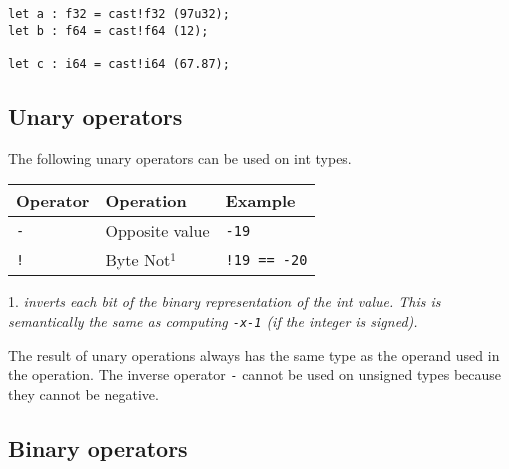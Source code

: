\begin{itemize}
  \begin{lstlisting}[style=coloredverbatim]
let a : f32 = cast!f32 (97u32);
let b : f64 = cast!f64 (12);

let c : i64 = cast!i64 (67.87);
  \end{lstlisting}

\end{itemize}

\subsection{Unary operators}
\label{sec:orge691bb5}

The following unary operators can be used on int types.
\smallskip


\begin{center}
  \vspace{-5pt}
  \begin{threeparttable}
    \begin{tabular}{|l|ll|}
      \hline
      Operator & Operation & Example\\[0pt]
      \hline
      \hline
      \texttt{-} & Opposite value & \texttt{-19}\\[0pt]
      \hline
      \texttt{!} & Byte Not\(^{1}\) & \texttt{!19 == -20}\\[0pt]
      \hline
    \end{tabular}
    \begin{tablenotes}

    \item[1.] \footnotesize \textit{inverts each bit of the binary
      representation of the int value. This is semantically the same as
      computing \texttt{-x-1} (if the integer is signed).}

    \end{tablenotes}
  \end{threeparttable}
\end{center}

The result of unary operations always has the same type as the operand used in
the operation. The inverse operator \texttt{-} cannot be used on unsigned types
because they cannot be negative.


\subsection{Binary operators}
\label{sec:orgb91194f}

